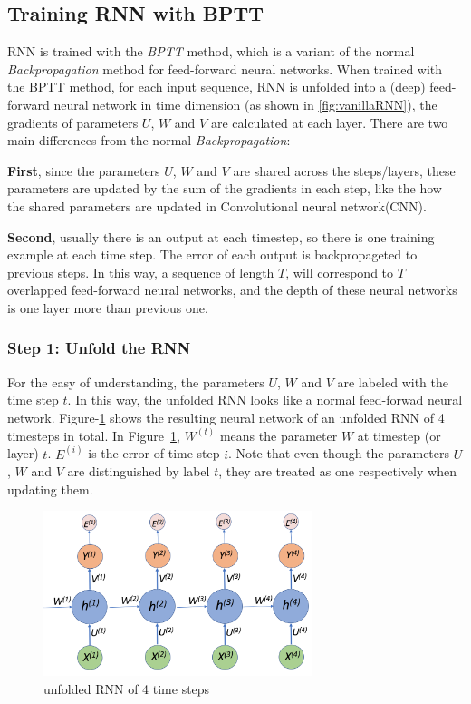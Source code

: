 \documentclass[english]{article}
\begin{document}
\subsection{Training RNN with BPTT}\label{sec:train-rnn}
RNN is trained with the \textit{BPTT} method, which is a variant of the normal 
\textit{Backpropagation} method for  feed-forward neural networks. When trained with the BPTT method, for each input sequence, RNN is unfolded into a (deep) feed-forward neural network in time dimension (as shown in \ref{fig:vanillaRNN}), the gradients of parameters $U$, $W$ and $V$ are calculated at each layer. 
There are two main differences from the normal \textit{Backpropagation}:  \par
 \textbf{First}, since the parameters $U$, $W$ and $V$ are shared across the steps/layers, these parameters are updated by the sum of the gradients in each step, like the how the shared parameters are updated in Convolutional neural network(CNN). \par
 \textbf{Second}, usually there is an output at each timestep,  so there is one training example at each time step.
 The error of each output is backpropageted to previous steps. In this way, a sequence of  length $T$, will correspond to $T$ overlapped feed-forward neural networks, and the depth of these neural networks is one layer more than previous one.


\subsubsection{Step 1: Unfold the RNN}
For the easy of understanding, the parameters $U$, $W$ and $V$  are labeled with the time step $t$.  In this way, the unfolded RNN looks like a normal
feed-forwad neural network. Figure-\ref{fig:rnn4} shows the resulting neural network of an unfolded RNN of 4 timesteps in total. 
In Figure~\ref{fig:rnn4}, $W^{(t)}$ means the parameter $W$ at timestep (or layer) $t$. $E^{(i)}$ is the error of time step $i$.  Note that even though the parameters $U$, $W$ and $V$  are distinguished by label $t$,  they are treated as one respectively when updating them.

\begin{figure}[htbp]
	\centering
	\includegraphics[width=0.7\textwidth]{unfold-rnn}
	\caption{unfolded RNN of 4 time steps}
	\label{fig:rnn4}
\end{figure}
\end{document}
